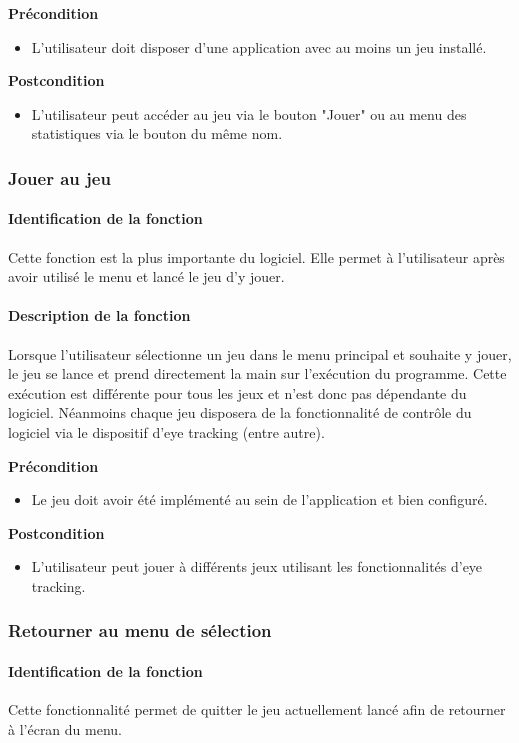\documentclass{polytech/polytech}
\begin{document}
\textbf{Précondition}
\begin{itemize}
\item L'utilisateur doit disposer d'une application avec au moins un jeu installé.
\end{itemize}

\textbf{Postcondition}
\begin{itemize}
\item L'utilisateur peut accéder au jeu via le bouton "Jouer" ou au menu des statistiques via le bouton du même nom.
\end{itemize}

\subsubsection{Jouer au jeu}
\paragraph{Identification de la fonction}
Cette fonction est la plus importante du logiciel. Elle permet à l'utilisateur après avoir utilisé le menu et lancé le jeu d'y jouer.
\paragraph{Description de la fonction}
Lorsque l'utilisateur sélectionne un jeu dans le menu principal et souhaite y jouer, le jeu se lance et prend directement la main sur l'exécution du programme. Cette exécution est différente pour tous les jeux et n'est donc pas dépendante du logiciel. Néanmoins chaque jeu disposera de la fonctionnalité de contrôle du logiciel via le dispositif d'eye tracking (entre autre).

\textbf{Précondition}
\begin{itemize}
\item Le jeu doit avoir été implémenté au sein de l'application et bien configuré.
\end{itemize}

\textbf{Postcondition}
\begin{itemize}
\item L'utilisateur peut jouer à différents jeux utilisant les fonctionnalités d'eye tracking.
\end{itemize}

\subsubsection{Retourner au menu de sélection}
\paragraph{Identification de la fonction}
Cette fonctionnalité permet de quitter le jeu actuellement lancé afin de retourner à l'écran du menu. 
\end{document}
